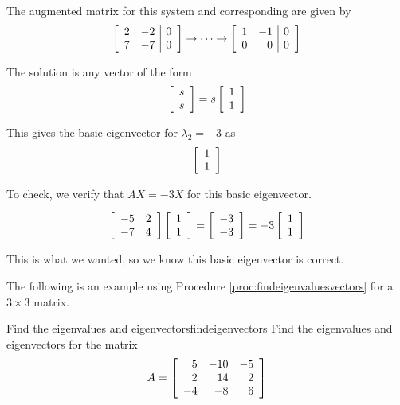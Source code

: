 \begin{solution}
The augmented matrix for this system and corresponding {\rref} are given by 
\[
\left[ \begin{array}{rr|r}
2 & -2 & 0 \\
7 & -7 & 0
\end{array}\right] 
\rightarrow \cdots \rightarrow 
\left[ \begin{array}{rr|r}
1 & -1 & 0 \\
0 & 0 & 0 
\end{array} \right] 
\]

The solution is any vector of the form
\[
\left[ \begin{array}{c}
s \\
s
\end{array} \right]
=
s
\left[ \begin{array}{r}
1 \\
1
\end{array} \right]
\]

This gives the basic eigenvector for $\lambda_2 = -3$ as 
\[
\left[ \begin{array}{r}
1\\
1
\end{array} \right]
\]

To check, we verify that $AX = -3X$ for this basic eigenvector. 

\[
\left[ \begin{array}{rr}
-5 & 2 \\
-7 & 4
\end{array}\right] 
\left[ \begin{array}{r}
1 \\
1
\end{array} \right]
=
\left[ \begin{array}{r}
-3 \\
-3
\end{array}\right]
=
-3
\left[ \begin{array}{r}
1\\
1
\end{array}
\right]
\]

This is what we wanted, so we know this basic eigenvector is correct. 
\end{solution}

The following is an example using Procedure \ref{proc:findeigenvaluesvectors} for a $3 \times 3$ matrix. 

\begin{example}{Find the eigenvalues and eigenvectors}{findeigenvectors}
Find the eigenvalues and eigenvectors for the matrix
\begin{equation*}
A=\left[ 
\begin{array}{rrr}
5 & -10 & -5 \\
2 & 14 & 2 \\
-4 & -8 & 6
\end{array}
\right] 
\end{equation*}
\end{example}

